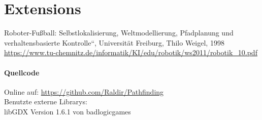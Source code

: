 \documentclass[paper=A4,pagesize=auto,13pt,headinclude=true,footinclude=true,BCOR=0mm,DIV=calc]{scrartcl}
\begin{document}
	\section{Extensions}
	
	
	
	\newpage
	
	\begin{thebibliography}{xxxxxx}
		 Roboter-Fußball: Selbstlokalisierung, Weltmodellierung, Pfadplanung und verhaltensbasierte Kontrolle“, Universität Freiburg, Thilo Weigel, 1998 \url{https://www.tu-chemnitz.de/informatik/KI/edu/robotik/ws2011/robotik_10.pdf}
	\end{thebibliography}
	
	
	
	\paragraph{Quellcode}
	Online auf: \url{https://github.com/Raldir/Pathfinding}\\
	Benutzte externe Librarys:\\
	libGDX Version 1.6.1 von badlogicgames\\
\end{document}
